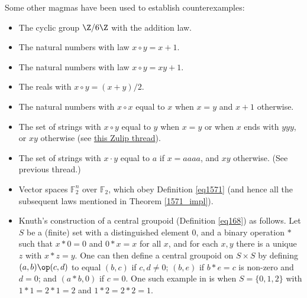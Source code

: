 Some other magmas have been used to establish counterexamples:
\begin{itemize}
  \item The cyclic group $\Z/6\Z$ with the addition law.
  \item The natural numbers with law $x \circ y = x+1$.
  \item The natural numbers with law $x \circ y = xy+1$.
  \item The reals with $x \circ y = (x+y)/2$.
  \item The natural numbers with $x \circ x$ equal to $x$ when $x=y$ and $x+1$ otherwise.
  \item The set of strings with $x \circ y$ equal to $y$ when $x=y$ or when $x$ ends with $yyy$, or $xy$ otherwise (see \href{https://leanprover.zulipchat.com/#narrow/stream/458659-Equational/topic/3102.20does.20not.20imply.203176}{this Zulip thread}).
  \item The set of strings with $x \cdot y$ equal to $a$ if $x=aaaa$, and $xy$ otherwise.  (See previous thread.)
  \item Vector spaces ${\mathbb F}_2^n$ over ${\mathbb F}_2$, which obey Definition \ref{eq1571} (and hence all the subsequent laws mentioned in Theorem \ref{1571_impl}).
  \item Knuth's construction \cite{knuth} of a central groupoid (Definition \ref{eq168}) as follows.  Let $S$ be a (finite) set with a distinguished element $0$, and a binary operation $*$ such that $x*0=0$ and $0*x=x$   for all $x$, and for each $x,y$ there is a unique $z$ with $x*z=y$.  One can then define a central groupoid on $S \times S$ by defining $(a,b) \op (c,d)$ to equal $(b,c)$ if $c,d \neq 0$; $(b,e)$ if $b*e=c$ is non-zero and $d=0$; and $(a*b,0)$ if $c=0$.  One such example in \cite{knuth} is when $S = \{0,1,2\}$ with $1*1=2*1=2$ and $1*2=2*2=1$.
\end{itemize}
